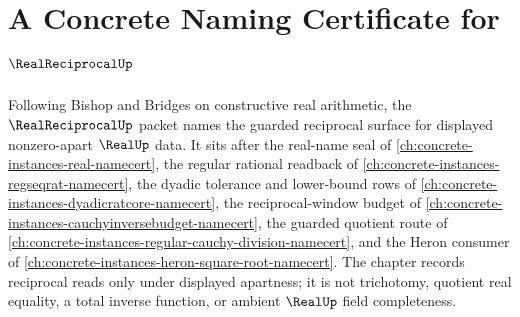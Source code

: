 \chapter{A Concrete Naming Certificate for $\RealReciprocalUp$}
\label{ch:concrete-instances-real-reciprocal-namecert}

Following Bishop and Bridges on constructive real arithmetic, the $\RealReciprocalUp$ packet names the guarded reciprocal surface for displayed nonzero-apart $\RealUp$ data. It sits after the real-name seal of \autoref{ch:concrete-instances-real-namecert}, the regular rational readback of \autoref{ch:concrete-instances-regseqrat-namecert}, the dyadic tolerance and lower-bound rows of \autoref{ch:concrete-instances-dyadicratcore-namecert}, the reciprocal-window budget of \autoref{ch:concrete-instances-cauchyinversebudget-namecert}, the guarded quotient route of \autoref{ch:concrete-instances-regular-cauchy-division-namecert}, and the Heron consumer of \autoref{ch:concrete-instances-heron-square-root-namecert}. The chapter records reciprocal reads only under displayed apartness; it is not trichotomy, quotient real equality, a total inverse function, or ambient $\RealUp$ field completeness.

